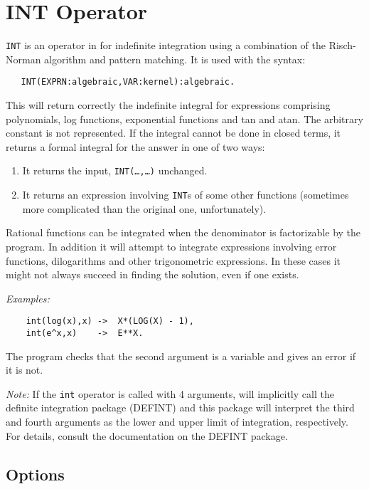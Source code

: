 \section{INT Operator}
\hypertarget{operator:INT}{}
{\tt INT} is an operator in {\REDUCE} for indefinite
integration using a
combination of the Risch-Norman algorithm and pattern matching.  It is
used with the syntax:
\begin{verbatim}
   INT(EXPRN:algebraic,VAR:kernel):algebraic.
\end{verbatim}
This will return correctly the indefinite integral for expressions comprising
polynomials, log functions, exponential functions and tan and atan. The
arbitrary constant is not represented. If the integral cannot be done in
closed terms, it returns a formal integral for the answer in one of two ways:
\begin{enumerate}
\item It returns the input, {\tt INT(\ldots,\ldots)} unchanged.

\item It returns an expression involving {\tt INT}s of some
      other functions (sometimes more complicated than
      the original one, unfortunately).
\end{enumerate}
Rational functions can be integrated when the denominator is factorizable
by the program. In addition it will attempt to integrate expressions
involving error functions, dilogarithms and other trigonometric
expressions. In these cases it might not always succeed in finding the
solution, even if one exists.

{\it Examples:}
\begin{verbatim}
	int(log(x),x) ->  X*(LOG(X) - 1),
	int(e^x,x)    ->  E**X.
\end{verbatim}
The program checks that the second argument is a variable and gives an
error if it is not.

{\it Note:} If the {\tt int} operator is called with 4 arguments,
{\REDUCE} will implicitly call the definite integration package (DEFINT)
and this package will interpret the third and fourth arguments as the lower
and upper limit of integration, respectively.  For details, consult
the documentation on the DEFINT package.


\subsection{Options}
\hypertarget{switch:TRINT}{}
\hypertarget{switch:FAILHARD}{}
\hypertarget{switch:NOLNR}{}

